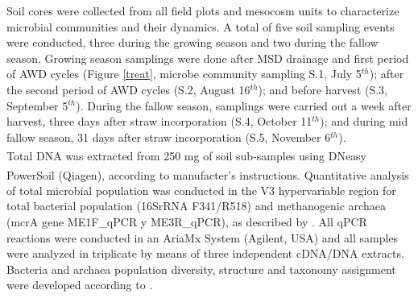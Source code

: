 Soil cores were collected from all field plots and mesocosm units to characterize microbial communities and their dynamics. A total of five soil sampling events were conducted, three during  the growing season and two during the fallow season. Growing season samplings were done after MSD drainage and first period of AWD cycles (Figure \ref{treat}, microbe community sampling S.1, July 5$^{th}$); after the second period of AWD cycles (S.2, August 16$^{th}$); and before harvest (S.3, September 5$^{th}$). During the fallow season, samplings were carried out a week after harvest, three days after straw incorporation (S.4, October 11$^{th}$); and during mid fallow season, 31 days after straw incorporation (S.5, November 6$^{th}$). \\

Total DNA was extracted from 250 mg of soil sub-samples using DNeasy\textsuperscript{\textregistered}
PowerSoil\textsuperscript{\textregistered} (Qiagen), according to manufacter's instructions. Quantitative analysis of total microbial population was conducted in the V3 hypervariable region for total bacterial population (16SrRNA F341/R518) and methanogenic archaea (mcrA gene ME1F\_qPCR y ME3R\_qPCR), as described by \cite{sotres2015}. All qPCR reactions were conducted in an AriaMx System (Agilent, USA)  and all samples were analyzed in triplicate by means of three independent cDNA/DNA extracts. Bacteria and archaea population diversity, structure and taxonomy assignment were developed according to \cite{carreras-sempere2024}.\\


